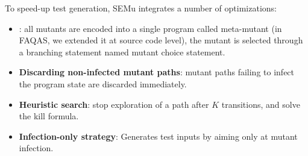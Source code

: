 %
%
%
%



To speed-up test generation, SEMu integrates a number of optimizations:
\begin{itemize}
	\item {}: all mutants are encoded into a single program called meta-mutant (in FAQAS, we extended it at source code level), the mutant is selected through a branching statement named mutant choice statement.
	\item \textbf{Discarding non-infected mutant paths}: mutant paths failing to infect the program state are discarded immediately.
	\item \textbf{Heuristic search}: stop exploration of a path after $K$ transitions, and solve the kill formula.
	\item \textbf{Infection-only strategy}: Generates test inputs by aiming only at mutant infection.
\end{itemize}

